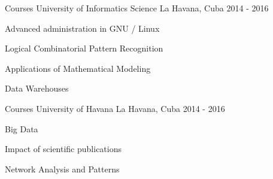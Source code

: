 


\begin{cventries}


\cventry
{Courses} %
{University of Informatics Science} %
{La Havana, Cuba} %
{2014 - 2016} %
{ %
\begin{cvitems}
\item {Advanced administration in GNU / Linux}
\item {Logical Combinatorial Pattern Recognition}
\item {Applications of Mathematical Modeling}
\item {Data Warehouses}
\end{cvitems}
}


\cventry
{Courses} %
{University of Havana} %
{La Havana, Cuba} %
{2014 - 2016} %
{ %
\begin{cvitems}
\item {Big Data}
\item {Impact of scientific publications}
\item {Network Analysis and Patterns}
\end{cvitems}
}




\end{cventries}
